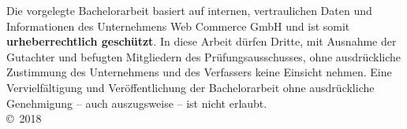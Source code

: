 
\singlespacing
\noindent Die vorgelegte Bachelorarbeit basiert auf internen, vertraulichen Daten und Informationen des Unternehmens Web Commerce GmbH und ist somit \textbf{urheberrechtlich geschützt}. In diese Arbeit dürfen Dritte, mit Ausnahme der Gutachter und befugten Mitgliedern des Prüfungsausschusses, ohne ausdrückliche Zustimmung des Unternehmens und des Verfassers keine Einsicht nehmen. Eine Vervielfältigung und Veröffentlichung der Bachelorarbeit ohne ausdrückliche Genehmigung – auch auszugsweise – ist nicht erlaubt. \\[3ex]
\copyright\ 2018 \ \Autor